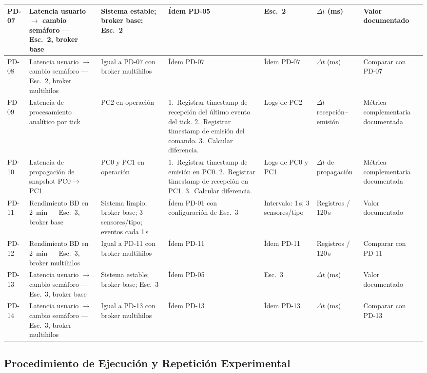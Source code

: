 \documentclass[12pt, a4paper]{article}
\begin{document}
\begin{footnotesize}
\begin{longtable}{|L{0.7cm}|L{2.3cm}|L{2.3cm}|L{2.3cm}|L{2.0cm}|L{2.0cm}|L{2.3cm}|}
PD-07 &
Latencia usuario $\to$ cambio semáforo --- Esc.~2, broker base &
Sistema estable; broker base; Esc.~2 &
Ídem PD-05 &
Esc.~2 &
$\Delta t$ (ms) &
Valor documentado \\
\hline

PD-08 &
Latencia usuario $\to$ cambio semáforo --- Esc.~2, broker multihilos &
Igual a PD-07 con broker multihilos &
Ídem PD-07 &
Ídem PD-07 &
$\Delta t$ (ms) &
Comparar con PD-07 \\
\hline

PD-09 &
Latencia de procesamiento analítico por tick &
PC2 en operación &
1.~Registrar timestamp de recepción del último evento del tick. 2.~Registrar timestamp de emisión del comando. 3.~Calcular diferencia. &
Logs de PC2 &
$\Delta t$ recepción--emisión &
Métrica complementaria documentada \\
\hline

PD-10 &
Latencia de propagación de snapshot PC0$\to$PC1 &
PC0 y PC1 en operación &
1.~Registrar timestamp de emisión en PC0. 2.~Registrar timestamp de recepción en PC1. 3.~Calcular diferencia. &
Logs de PC0 y PC1 &
$\Delta t$ de propagación &
Métrica complementaria documentada \\
\hline

PD-11 &
Rendimiento BD en 2~min --- Esc.~3, broker base &
Sistema limpio; broker base; 3 sensores/tipo; eventos cada 1\,s &
Ídem PD-01 con configuración de Esc.~3 &
Intervalo: 1\,s; 3 sensores/tipo &
Registros / 120\,s &
Valor documentado \\
\hline

PD-12 &
Rendimiento BD en 2~min --- Esc.~3, broker multihilos &
Igual a PD-11 con broker multihilos &
Ídem PD-11 &
Ídem PD-11 &
Registros / 120\,s &
Comparar con PD-11 \\
\hline

PD-13 &
Latencia usuario $\to$ cambio semáforo --- Esc.~3, broker base &
Sistema estable; broker base; Esc.~3 &
Ídem PD-05 &
Esc.~3 &
$\Delta t$ (ms) &
Valor documentado \\
\hline

PD-14 &
Latencia usuario $\to$ cambio semáforo --- Esc.~3, broker multihilos &
Igual a PD-13 con broker multihilos &
Ídem PD-13 &
Ídem PD-13 &
$\Delta t$ (ms) &
Comparar con PD-13 \\
\hline
\end{longtable}
\end{footnotesize}

\subsection{Procedimiento de Ejecución y Repetición Experimental}
\end{document}
